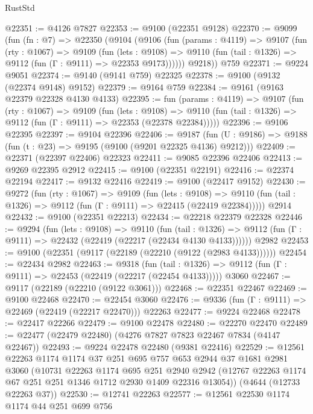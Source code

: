\begin{lexlean}{RustStd}
\begin{coremodule}
@22351 := @4126 @7827
@22353 := @9100 (@22351 @9128)
@22370 := @9099
    (fun (fn : @7) =>
    @22350
      (@9104
        (@9106
          (fun (params : @4119) =>
          @9107
            (fun (rty : @1067) =>
            @9109
              (fun (lets : @9108) =>
              @9110 (fun (tail : @1326) => @9112 (fun (Γ : @9111) => @22353 @9173))))))
        @9218))
    @759
@22371 := @9224 @9051
@22374 := @9140 (@9141 @759) @22325
@22378 := @9100 (@9132 (@22374 @9148) @9152)
@22379 := @9164 @759
@22384 := @9161 (@9163 @22379 @22328 @4130 @4133)
@22395 := fun (params : @4119) =>
  @9107
    (fun (rty : @1067) =>
    @9109
      (fun (lets : @9108) =>
      @9110 (fun (tail : @1326) => @9112 (fun (Γ : @9111) => @22353 (@22378 @22384)))))
@22396 := @9106 @22395
@22397 := @9104 @22396
@22406 := @9187
    (fun (U : @9186) => @9188 (fun (t : @23) => @9195 (@9100 (@9201 @22325 @4136) @9212)))
@22409 := @22371 (@22397 @22406) @22323
@22411 := @9085 @22396 @22406
@22413 := @9269 @22395 @2912
@22415 := @9100 (@22351 @22191)
@22416 := @22374 @22194
@22417 := @9132 @22416
@22419 := @9100 (@22417 @9152)
@22430 := @9272
    (fun (rty : @1067) =>
    @9109
      (fun (lets : @9108) =>
      @9110 (fun (tail : @1326) => @9112 (fun (Γ : @9111) => @22415 (@22419 @22384)))))
    @2914
@22432 := @9100 (@22351 @22213)
@22434 := @22218 @22379 @22328
@22446 := @9294
    (fun (lets : @9108) =>
    @9110
      (fun (tail : @1326) =>
      @9112 (fun (Γ : @9111) => @22432 (@22419 (@22217 (@22434 @4130 @4133))))))
    @2982
@22453 := @9100 (@22351 (@9117 (@22189 (@22210 (@9122 (@2983 @4133))))))
@22454 := @22434 @2982
@22463 := @9318
    (fun (tail : @1326) => @9112 (fun (Γ : @9111) => @22453 (@22419 (@22217 (@22454 @4133)))))
    @3060
@22467 := @9117 (@22189 (@22210 (@9122 @3061)))
@22468 := @22351 @22467
@22469 := @9100 @22468
@22470 := @22454 @3060
@22476 := @9336 (fun (Γ : @9111) => @22469 (@22419 (@22217 @22470))) @22263
@22477 := @9224 @22468
@22478 := @22417 @22266
@22479 := @9100 @22478
@22480 := @22270 @22470
@22489 := @22477 (@22479 @22480) (@4276 @7827 @7823 @22467 @7834 (@4147 @22467))
@22493 := @9224 @22478 @22480 (@9381 @22416)
@22529 := @12561
    @22263
    @1174
    @1174
    @37
    @251
    @695
    @757
    @653
    @2944
    @37
    @1681
    @2981
    @3060
    (@10731
      @22263
      @1174
      @695
      @251
      @2940
      @2942
      (@12767 @22263 @1174 @67 @251 @251 @1346 @1712 @2930 @1409 @22316 @13054))
    (@4644 (@12733 @22263 @37))
@22530 := @12741 @22263
@22577 := @12561
    @22530
    @1174
    @1174
    @44
    @251
    @699
    @756

\end{coremodule}
\end{lexlean}
